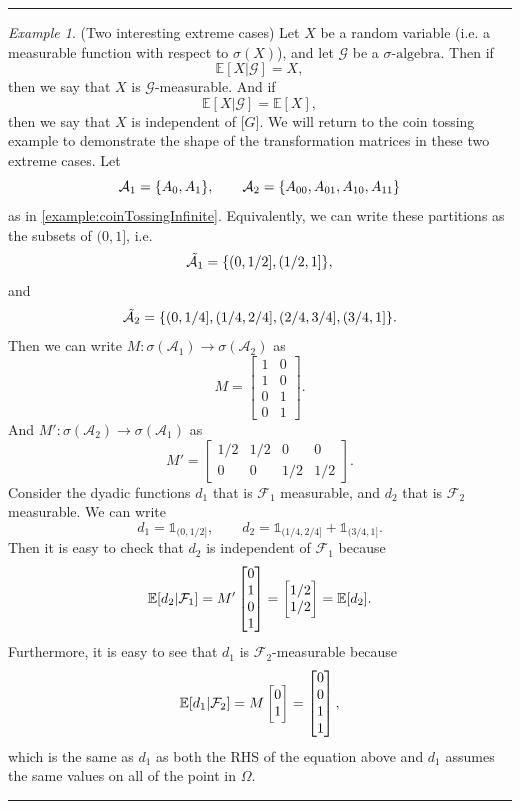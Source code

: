 \documentclass[11pt,a4paper]{article}
\theoremstyle{definition}
\theoremstyle{remark}
\newtheorem{example}{Example}
\newcommand{\E}{\mathbb{E}}
\begin{document}
	\vspace{5pt}
	\hrule
	\begin{example}(Two interesting extreme cases)
		Let $ X $ be a random variable (i.e. a measurable function with respect to $ \sigma(X) $), and let $ \mathcal{G} $ be a $\sigma\text{-algebra}$. Then if
		\[ \E[X|\mathcal{G}] = X, \]
		then we say that $ X $ is $ \mathcal{G} $-measurable. And if 
		\[ \E[X|\mathcal{G}] = \E[X], \] 
		then we say that $ X $ is independent of $ \mathcal[G] $. We will return to the coin tossing example to demonstrate the shape of the transformation matrices in these two extreme cases. Let
		\[ \mathcal{A}_1 = \{A_{0},A_1\}, \qquad \mathcal{A}_2 = \{A_{00},A_{01},A_{10},A_{11}\} \] 
		as in \autoref{example:coinTossingInfinite}. Equivalently, we can write these partitions as the subsets of $ (0,1] $, i.e.
		\[ \tilde{\mathcal{A}_1} = \{(0,1/2],(1/2,1]\},\]
		and 
		\[ \tilde{\mathcal{A}_2} = \{(0,1/4],(1/4,2/4],(2/4,3/4],(3/4,1]\}.  \]
		Then we can write $ M:\sigma(\mathcal{A}_1) \to\sigma(\mathcal{A}_2) $ as 
		\[ M = \begin{bmatrix}
			1 & 0 \\
			1 & 0 \\
			0 & 1 \\
			0 & 1
		\end{bmatrix}. \]
		And $ M' : \sigma(\mathcal{A}_2) \to \sigma(\mathcal{A}_1) $ as
		\[ M' = \begin{bmatrix}
			1/2 & 1/2 & 0 & 0 \\
			0 & 0 & 1/2 & 1/2
		\end{bmatrix}. \]
		Consider the dyadic functions $ d_1 $ that is $ \mathcal{F}_1 $ measurable, and $ d_2 $ that is $ \mathcal{F}_2 $ measurable. We can write
		\[ d_1 = \mathds{1}_{(0,1/2]}, \qquad d_2 = \mathds{1}_{(1/4,2/4]} + \mathds{1}_{(3/4,1]}. \]
		Then it is easy to check that $ d_2 $ is independent of $ \mathcal{F}_1 $ because
		\[ \E[d_2|\mathcal{F}_1] = M' \begin{bmatrix}
			0 \\ 1 \\ 0 \\ 1
		\end{bmatrix} = \vectt{1/2}{1/2} = \E[d_2].  \]
		Furthermore, it is easy to see that $ d_1 $ is $ \mathcal{F}_2 $-measurable because
		\[ \E[d_1|\mathcal{F}_2] = M \vectt{0}{1} = \begin{bmatrix}
			0 \\ 0 \\ 1 \\ 1
		\end{bmatrix}, \]
		which is the same as $ d_1 $ as both the RHS of the equation above and $ d_1 $ assumes the same values on all of the point in $ \Omega $.  
	\end{example}
	\hrule
	\vspace{5pt}
	
	
	
	
	
	
%	
%	
%	
	
\end{document}
